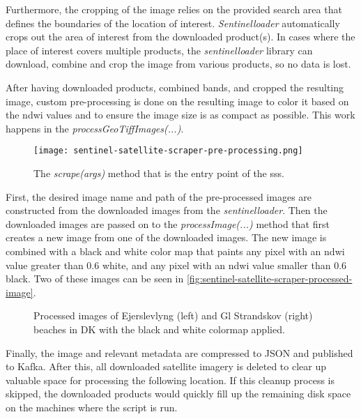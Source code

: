 Furthermore, the cropping of the image relies on the provided search area that defines the boundaries of the location of interest. \emph{Sentinelloader} automatically crops out the area of interest from the downloaded product(s). In cases where the place of interest covers multiple products, the \emph{sentinelloader} library can download, combine and crop the image from various products, so no data is lost.

After having downloaded products, combined bands, and cropped the resulting image, custom pre-processing is done on the resulting image to color it based on the \acrshort{ndwi} values and to ensure the image size is as compact as possible. This work happens in the \emph{processGeoTiffImages(...)}.

\begin{figure}[h!]
    \centering
    \texttt{[image: sentinel-satellite-scraper-pre-processing.png]}
    \caption{The \emph{scrape(args)} method that is the entry point of the \acrshort{sss}.}
    \label{fig:sentinel-satellite-scraper-pre-processing}
\end{figure}

First, the desired image name and path of the pre-processed images are constructed from the downloaded images from the \emph{sentinelloader}. Then the downloaded images are passed on to the \emph{processImage(...)} method that first creates a new image from one of the downloaded images. The new image is combined with a black and white color map that paints any pixel with an \acrshort{ndwi} value greater than 0.6 white, and any pixel with an \acrshort{ndwi} value smaller than 0.6 black. Two of these images can be seen in \autoref{fig:sentinel-satellite-scraper-processed-image}.

\begin{figure}[h!]
    \centering
    \caption{Processed images of Ejerslevlyng (left) and Gl Strandskov (right) beaches in DK with the black and white colormap applied.}
    \label{fig:sentinel-satellite-scraper-processed-image}
\end{figure}

Finally, the image and relevant metadata are compressed to JSON and published to Kafka. After this, all downloaded satellite imagery is deleted to clear up valuable space for processing the following location. If this cleanup process is skipped, the downloaded products would quickly fill up the remaining disk space on the machines where the script is run.

